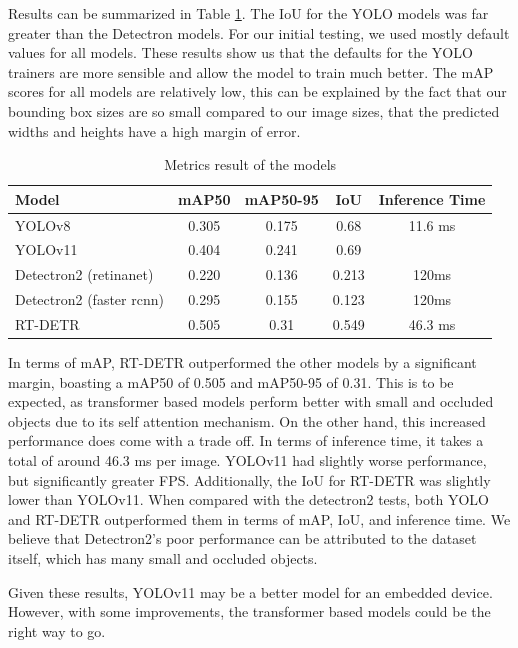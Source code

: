 \documentclass[stu,12pt,floatsintext]{apa7}
\begin{document}
Results can be summarized in Table \ref{tab:results}. The IoU for the YOLO models was far greater than the Detectron models. For our initial testing, we used mostly default values for all models. These results show us that the defaults for the YOLO trainers are more sensible and allow the model to train much better. The mAP scores for all models are relatively low, this can be explained by the fact that our bounding box sizes are so small compared to our image sizes, that the predicted widths and heights have a high margin of error.

\begin{table}[!htb]
	\centering
	\begin{tabular}{lcccc}
  \hline
  Model                    & mAP50 & mAP50-95 & IoU & Inference Time \\\hline
  YOLOv8                   & 0.305 & 0.175    & 0.68  & 11.6 ms\\ 
  YOLOv11                  & 0.404 & 0.241    & 0.69  & \\
  Detectron2 (retinanet)   & 0.220 & 0.136    & 0.213 & 120ms\\
  Detectron2 (faster rcnn) & 0.295 & 0.155    & 0.123 & 120ms\\
  RT-DETR                  & 0.505 & 0.31     & 0.549 & 46.3 ms\\\hline
	\end{tabular}
	\caption{Metrics result of the models}
	\label{tab:results}
\end{table}



In terms of mAP, RT-DETR outperformed the other models by a significant margin, boasting a mAP50 of 0.505 and mAP50-95 of 0.31. This is to be expected, as transformer based models perform better with small and occluded objects due to its self attention mechanism. On the other hand, this increased performance does come with a trade off. In terms of inference time, it takes a total of around 46.3 ms per image. YOLOv11 had slightly worse performance, but significantly greater FPS. Additionally, the IoU for RT-DETR was slightly lower than YOLOv11. When compared with the detectron2 tests, both YOLO and RT-DETR outperformed them in terms of mAP, IoU, and inference time. We believe that Detectron2's poor performance can be attributed to the dataset itself, which has many small and occluded objects. 

Given these results, YOLOv11 may be a better model for an embedded device. However, with some improvements, the transformer based models could be the right way to go. 
\end{document}
